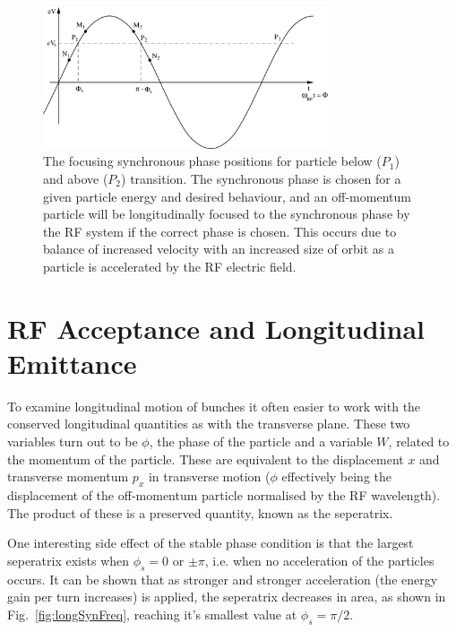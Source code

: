 \begin{figure}
\begin{center}
\includegraphics[width=0.75\textwidth]{appendices/figures/longStab.png}
\end{center}
\caption{The focusing synchronous phase positions for particle below ($P_{1}$) and above ($P_{2}$) transition. The synchronous phase is chosen for a given particle energy and desired behaviour, and an off-momentum particle will be longitudinally focused to the synchronous phase by the RF system if the correct phase is chosen. This occurs due to balance of increased velocity with an increased size of orbit as a particle is accelerated by the RF electric field.}
\label{fig:longPhase}
\end{figure}

\section{RF Acceptance and Longitudinal Emittance}

To examine longitudinal motion of bunches it often easier to work with the conserved longitudinal quantities as with the transverse plane. These two variables turn out to be $\phi$, the phase of the particle and a variable $W$, related to the momentum of the particle. These are equivalent to the displacement $x$ and transverse momentum $p_{x}$ in transverse motion ($\phi$ effectively being the displacement of the off-momentum particle normalised by the RF wavelength). The product of these is a preserved quantity, known as the seperatrix.

One interesting side effect of the stable phase condition is that the largest seperatrix exists when $\phi_{s}= 0$ or $\pm \pi$, i.e. when no acceleration of the particles occurs. It can be shown that as stronger and stronger acceleration (the energy gain per turn increases) is applied, the seperatrix decreases in area, as shown in Fig.~\ref{fig:longSynFreq}, reaching it's smallest value at $\phi_{s} = \pi / 2$.

